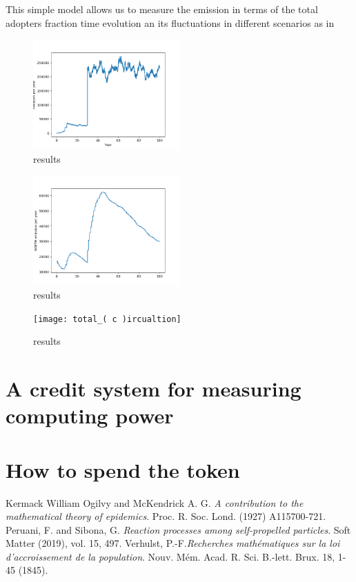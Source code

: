 \documentclass[11pt]{amsart}
\numberwithin{equation}{section}
\theoremstyle{definition}
\theoremstyle{remark}
\renewcommand{\_}[1]{_{\left( #1 \right)}}
\renewcommand{\^}[1]{^{\left( #1 \right)}}
\begin{document}
This simple model allows us to measure the emission in terms of the total adopters fraction time evolution an its fluctuations in different scenarios as in 

\begin{figure}
\centering
\includegraphics[width=0.5\textwidth]{adopter_per_year}
\caption{results}
\label{fig: adopters}
\end{figure}

\begin{figure}
\centering
\includegraphics[width=0.5\textwidth]{noth_emission}
\caption{results}
\label{fig: noeth_emission}
\end{figure}

\begin{figure}
\centering
\texttt{[image: total\_circualtion]}
\caption{results}
\label{fig: total_circulation}
\end{figure}

\section{A credit system for measuring computing power}\label{sec:credit-system}
\section*{How to spend the token}


\begin{thebibliography}{MPP}
	 Kermack William Ogilvy and McKendrick A. G. \emph{A contribution to the mathematical theory of epidemics}. Proc. R. Soc. Lond. (1927) A115700-721.
	 Peruani, F. and Sibona, G.  \emph{Reaction processes among self-propelled particles}. Soft Matter (2019), vol. 15, 497.
	 Verhulst, P.-F.\emph{Recherches math\'ematiques sur la loi d'accroissement de la population}. Nouv. M\'em. Acad. R. Sci. B.-lett. Brux. 18, 1-45 (1845).
\end{thebibliography}
\end{document}
